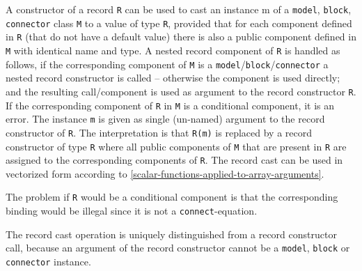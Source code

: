 A constructor of a record \lstinline!R! can be used to cast an instance m of a \lstinline!model!, \lstinline!block!, \lstinline!connector! class \lstinline!M! to a value of type \lstinline!R!, provided that for each component defined in \lstinline!R! (that do not have a default value) there is also a public component defined in \lstinline!M! with identical name and type.
A nested record component of \lstinline!R! is handled as follows, if the corresponding component of \lstinline!M! is a \lstinline!model!/\lstinline!block!/\lstinline!connector! a nested record constructor is called -- otherwise the component is used directly; and the resulting call/component is used as argument to the record constructor \lstinline!R!.
If the corresponding component of \lstinline!R! in \lstinline!M! is a conditional component, it is an error.
The instance \lstinline!m! is given as single (un-named) argument to the record constructor of \lstinline!R!.
The interpretation is that \lstinline!R(m)! is replaced by a record constructor of type \lstinline!R! where all public components of \lstinline!M! that are present in \lstinline!R! are assigned to the corresponding components of \lstinline!R!.
The record cast can be used in vectorized form according to \cref{scalar-functions-applied-to-array-arguments}.

\begin{nonnormative}
The problem if \lstinline!R! would be a conditional component is that the corresponding binding would be illegal since it is not a \lstinline!connect!-equation.
\end{nonnormative}

\begin{nonnormative}
The record cast operation is uniquely distinguished from a record constructor call, because an argument of the record constructor cannot be a \lstinline!model!, \lstinline!block! or \lstinline!connector! instance.
\end{nonnormative}

